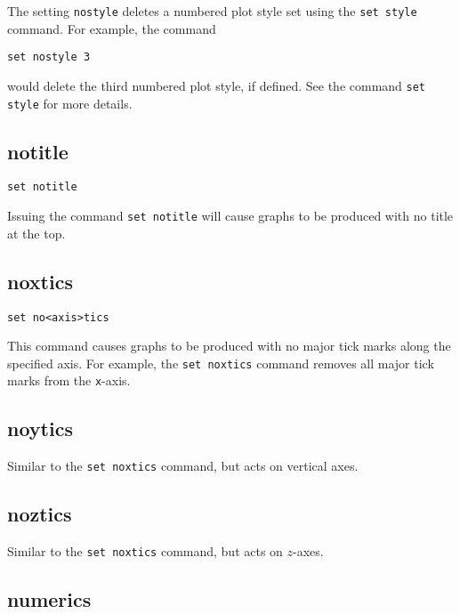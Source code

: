 The setting {\tt nostyle} deletes a numbered plot style set using the {\tt set
style} command. For example, the command

\begin{verbatim}
set nostyle 3
\end{verbatim}

\noindent would delete the third numbered plot style, if defined. See the
command {\tt set style} for more details.


\subsection{notitle}

\begin{verbatim}
set notitle
\end{verbatim}

Issuing the command {\tt set notitle} will cause graphs to be produced with no
title at the top.


\subsection{noxtics}

\begin{verbatim}
set no<axis>tics
\end{verbatim}

This command causes graphs to be produced with no major tick marks along the
specified axis. For example, the {\tt set noxtics} command removes all major
tick marks from the {\tt x}-axis.


\subsection{noytics}

Similar to the {\tt set noxtics} command, but acts on vertical axes.


\subsection{noztics}

Similar to the {\tt set noxtics} command, but acts on $z$-axes.


\subsection{numerics}

